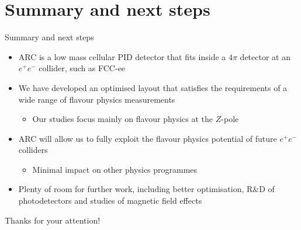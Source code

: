 \documentclass{beamer}
\begin{document}
\section{Summary and next steps}
\begin{frame}{Summary and next steps}
  \begin{itemize}
    \setlength\itemsep{1.5em}
    \item{ARC is a low mass cellular PID detector that fits inside a $4\pi$ detector at an $e^+e^-$ collider, such as FCC-ee}
    \item{We have developed an optimised layout that satisfies the requirements of a wide range of flavour physics measurements}
    \begin{itemize}
      \item{Our studies focus mainly on flavour physics at the $Z$-pole}
    \end{itemize}
    \item{ARC will allow us to fully exploit the flavour physics potential of future $e^+e^-$ colliders}
    \begin{itemize}
      \item{Minimal impact on other physics programmes}
    \end{itemize}
    \item{Plenty of room for further work, including better optimisation, R\&D of photodetectors and studies of magnetic field effects}
  \end{itemize}
  \begin{center}
    \huge Thanks for your attention!
  \end{center}
\end{frame}
\end{document}
